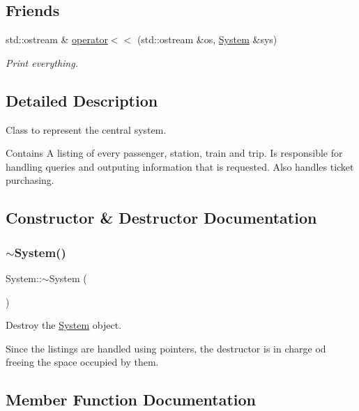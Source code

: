 \subsection*{Friends}
\begin{DoxyCompactItemize}
\item 
std\+::ostream \& \mbox{\hyperlink{classSystem_a1efa95132e95a7a6b11c3b54916d66ae}{operator$<$$<$}} (std\+::ostream \&os, \mbox{\hyperlink{classSystem}{System}} \&sys)
\begin{DoxyCompactList}\small\item\em Print everything. \end{DoxyCompactList}\end{DoxyCompactItemize}


\subsection{Detailed Description}
Class to represent the central system. 

Contains A listing of every passenger, station, train and trip. Is responsible for handling queries and outputing information that is requested. Also handles ticket purchasing. 

\subsection{Constructor \& Destructor Documentation}
\mbox{\label{classSystem_a3be70bb338e3f062f821173fd15680d0}} 
\subsubsection{\texorpdfstring{$\sim$\+System()}{~System()}}
{\footnotesize\ttfamily System\+::$\sim$\+System (\begin{DoxyParamCaption}{ }\end{DoxyParamCaption})}



Destroy the \mbox{\hyperlink{classSystem}{System}} object. 

Since the listings are handled using pointers, the destructor is in charge od freeing the space occupied by them. 

\subsection{Member Function Documentation}
\mbox{\label{classSystem_a9e317da5b607c6dee850089f340dd9e7}} 

